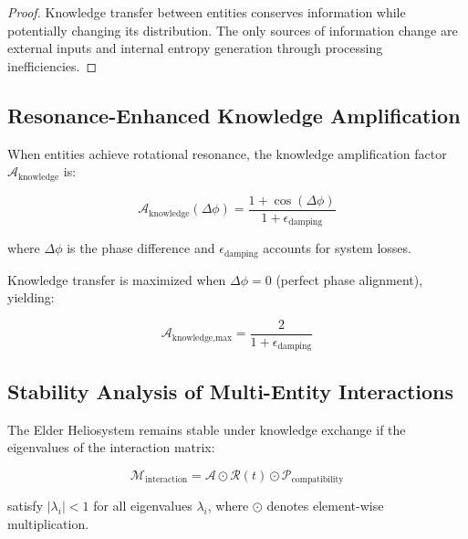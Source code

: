 \begin{proof}
Knowledge transfer between entities conserves information while potentially changing its distribution. The only sources of information change are external inputs and internal entropy generation through processing inefficiencies.
\end{proof}

\subsection{Resonance-Enhanced Knowledge Amplification}

\begin{definition}
When entities achieve rotational resonance, the knowledge amplification factor $\mathcal{A}_{\text{knowledge}}$ is:

\begin{equation}
\mathcal{A}_{\text{knowledge}}(\Delta\phi) = \frac{1 + \cos(\Delta\phi)}{1 + \epsilon_{\text{damping}}}
\end{equation}

where $\Delta\phi$ is the phase difference and $\epsilon_{\text{damping}}$ accounts for system losses.
\end{definition}

\begin{corollary}
Knowledge transfer is maximized when $\Delta\phi = 0$ (perfect phase alignment), yielding:

\begin{equation}
\mathcal{A}_{\text{knowledge,max}} = \frac{2}{1 + \epsilon_{\text{damping}}}
\end{equation}
\end{corollary}

\subsection{Stability Analysis of Multi-Entity Interactions}

\begin{theorem}
The Elder Heliosystem remains stable under knowledge exchange if the eigenvalues of the interaction matrix:

\begin{equation}
\mathcal{M}_{\text{interaction}} = \mathcal{A} \odot \mathcal{R}(t) \odot \mathcal{P}_{\text{compatibility}}
\end{equation}

satisfy $|\lambda_i| < 1$ for all eigenvalues $\lambda_i$, where $\odot$ denotes element-wise multiplication.
\end{theorem}

